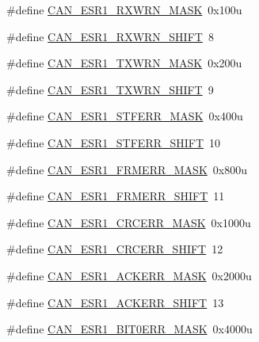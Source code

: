 \begin{DoxyCompactItemize}
\item 
\#define \hyperlink{group___c_a_n___register___masks_ga805a12fba10c76a26fddedeb8634bbe6}{C\+A\+N\+\_\+\+E\+S\+R1\+\_\+\+R\+X\+W\+R\+N\+\_\+\+M\+A\+SK}~0x100u
\item 
\#define \hyperlink{group___c_a_n___register___masks_ga879a6ef8506f66a73cfc185d6814ee4e}{C\+A\+N\+\_\+\+E\+S\+R1\+\_\+\+R\+X\+W\+R\+N\+\_\+\+S\+H\+I\+FT}~8
\item 
\#define \hyperlink{group___c_a_n___register___masks_ga62d716c6701375e3106853152e62a312}{C\+A\+N\+\_\+\+E\+S\+R1\+\_\+\+T\+X\+W\+R\+N\+\_\+\+M\+A\+SK}~0x200u
\item 
\#define \hyperlink{group___c_a_n___register___masks_ga62114b41b2b2c5fb95cedde48d06d361}{C\+A\+N\+\_\+\+E\+S\+R1\+\_\+\+T\+X\+W\+R\+N\+\_\+\+S\+H\+I\+FT}~9
\item 
\#define \hyperlink{group___c_a_n___register___masks_ga8af394ab6bb4356bc5fa71e2278332ad}{C\+A\+N\+\_\+\+E\+S\+R1\+\_\+\+S\+T\+F\+E\+R\+R\+\_\+\+M\+A\+SK}~0x400u
\item 
\#define \hyperlink{group___c_a_n___register___masks_ga5f22b1b4cc45dbd63a5adb638b7c61a2}{C\+A\+N\+\_\+\+E\+S\+R1\+\_\+\+S\+T\+F\+E\+R\+R\+\_\+\+S\+H\+I\+FT}~10
\item 
\#define \hyperlink{group___c_a_n___register___masks_ga85fea1af50a657cc862d71d166949cbd}{C\+A\+N\+\_\+\+E\+S\+R1\+\_\+\+F\+R\+M\+E\+R\+R\+\_\+\+M\+A\+SK}~0x800u
\item 
\#define \hyperlink{group___c_a_n___register___masks_ga0efc518d9eecfd7ed1eaefac3fd8ec23}{C\+A\+N\+\_\+\+E\+S\+R1\+\_\+\+F\+R\+M\+E\+R\+R\+\_\+\+S\+H\+I\+FT}~11
\item 
\#define \hyperlink{group___c_a_n___register___masks_gaaafa0a40c19015f5bc060267b18f2433}{C\+A\+N\+\_\+\+E\+S\+R1\+\_\+\+C\+R\+C\+E\+R\+R\+\_\+\+M\+A\+SK}~0x1000u
\item 
\#define \hyperlink{group___c_a_n___register___masks_ga1df87f92bcad133cc7c2677958c95ce4}{C\+A\+N\+\_\+\+E\+S\+R1\+\_\+\+C\+R\+C\+E\+R\+R\+\_\+\+S\+H\+I\+FT}~12
\item 
\#define \hyperlink{group___c_a_n___register___masks_ga10e077761a90dda3310ffc53a98569a7}{C\+A\+N\+\_\+\+E\+S\+R1\+\_\+\+A\+C\+K\+E\+R\+R\+\_\+\+M\+A\+SK}~0x2000u
\item 
\#define \hyperlink{group___c_a_n___register___masks_gabe4b1042038801b2ec9d302339d6869b}{C\+A\+N\+\_\+\+E\+S\+R1\+\_\+\+A\+C\+K\+E\+R\+R\+\_\+\+S\+H\+I\+FT}~13
\item 
\#define \hyperlink{group___c_a_n___register___masks_gadd6b78abb7a9321af68208f318c7c116}{C\+A\+N\+\_\+\+E\+S\+R1\+\_\+\+B\+I\+T0\+E\+R\+R\+\_\+\+M\+A\+SK}~0x4000u

\end{DoxyCompactItemize}
